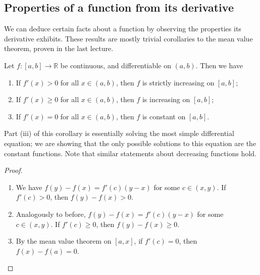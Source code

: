 \subsection{Properties of a function from its derivative}
We can deduce certain facts about a function by observing the properties its derivative exhibits.
These results are mostly trivial corollaries to the mean value theorem, proven in the last lecture.
\begin{corollary}
	Let \(f \colon [a,b] \to \mathbb R\) be continuous, and differentiable on \((a, b)\).
	Then we have
	\begin{enumerate}
		\item If \(f'(x) > 0\) for all \(x \in (a, b)\), then \(f\) is strictly increasing on \([a, b]\);
		\item If \(f'(x) \geq 0\) for all \(x \in (a, b)\), then \(f\) is increasing on \([a, b]\);
		\item If \(f'(x) = 0\) for all \(x \in (a, b)\), then \(f\) is constant on \([a, b]\).
	\end{enumerate}
\end{corollary}
Part (iii) of this corollary is essentially solving the most simple differential equation; we are showing that the only possible solutions to this equation are the constant functions.
Note that similar statements about decreasing functions hold.
\begin{proof}
	\begin{enumerate}
		\item We have \(f(y) - f(x) = f'(c)(y-x)\) for some \(c \in (x, y)\).
		      If \(f'(c) > 0\), then \(f(y) - f(x) > 0\).
		\item Analogously to before, \(f(y) - f(x) = f'(c)(y-x)\) for some \(c \in (x, y)\).
		      If \(f'(c) \geq 0\), then  \(f(y) - f(x) \geq 0\).
		\item By the mean value theorem on \([a, x]\), if \(f'(c) = 0\), then \(f(x) - f(a) = 0\).
	\end{enumerate}
\end{proof}

